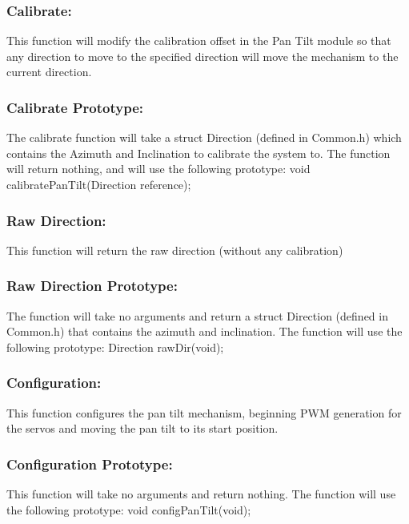 \documentclass[]{article}
\begin{document}
\subsubsection{Calibrate:}
This function will modify the calibration offset in the Pan Tilt module so that any direction to move to the specified direction will move the mechanism to the current direction.

\subsubsection{Calibrate Prototype:}
The calibrate function will take a struct Direction (defined in Common.h) which contains the Azimuth and Inclination to calibrate the system to. The function will return nothing, and will use the following prototype: \newline \newline
void calibratePanTilt(Direction reference);

\subsubsection{Raw Direction:}
This function will return the raw direction (without any calibration)

\subsubsection{Raw Direction Prototype:}
The function will take no arguments and return a struct Direction (defined in Common.h) that contains the azimuth and inclination. The function will use the following prototype: \newline \newline
Direction rawDir(void);

\subsubsection{Configuration:}
This function configures the pan tilt mechanism, beginning PWM generation for the servos and moving the pan tilt to its start position.

\subsubsection{Configuration Prototype:}
This function will take no arguments and return nothing. The function will use the following prototype: \newline \newline
void configPanTilt(void);
\end{document}
